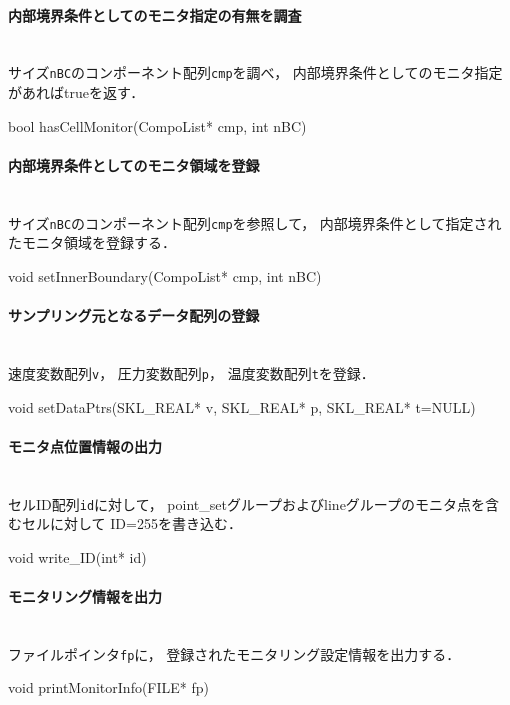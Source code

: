 %
\paragraph{内部境界条件としてのモニタ指定の有無を調査}\mbox{}\\
サイズ{\tt nBC}のコンポーネント配列{\tt cmp}を調べ，
内部境界条件としてのモニタ指定があればtrueを返す．
{\small
\begin{program}
bool hasCellMonitor(CompoList* cmp, int nBC) 
\end{program}
}

%
\paragraph{内部境界条件としてのモニタ領域を登録}\mbox{}\\
サイズ{\tt nBC}のコンポーネント配列{\tt cmp}を参照して，
内部境界条件として指定されたモニタ領域を登録する．
{\small
\begin{program}
void setInnerBoundary(CompoList* cmp, int nBC)
\end{program}
}

%
\paragraph{サンプリング元となるデータ配列の登録}\mbox{}\\
速度変数配列{\tt v}，
圧力変数配列{\tt p}，
温度変数配列{\tt t}を登録．
{\small
\begin{program}
void setDataPtrs(SKL_REAL* v, SKL_REAL* p, SKL_REAL* t=NULL)
\end{program}
}

%
\paragraph{モニタ点位置情報の出力}\mbox{}\\
セルID配列{\tt id}に対して，
point\_setグループおよびlineグループのモニタ点を含むセルに対して
ID=255を書き込む．
{\small
\begin{program}
void write_ID(int* id)
\end{program}
}

%
\pagebreak
\paragraph{モニタリング情報を出力}\mbox{}\\
ファイルポインタ{\tt fp}に，
登録されたモニタリング設定情報を出力する．
{\small
\begin{program}
void printMonitorInfo(FILE* fp)
\end{program}
}

